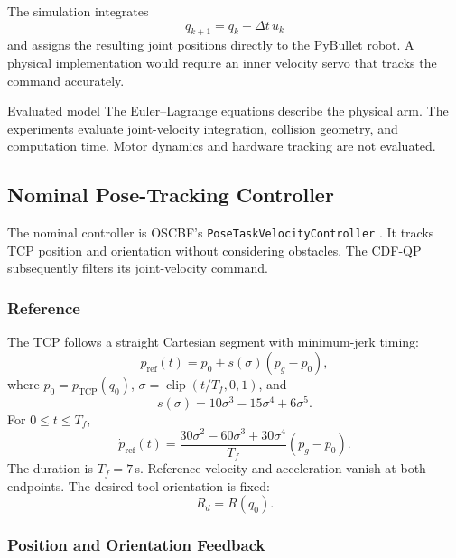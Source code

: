 \documentclass[conference]{IEEEtran}
\DeclareMathOperator{\clip}{clip}
\begin{document}
The simulation integrates
\begin{equation}
    q_{k+1}=q_k+\Delta t\,u_k
    \label{eq:integration}
\end{equation}
and assigns the resulting joint positions directly
to the PyBullet robot. A physical implementation
would require an inner velocity servo that tracks
the command accurately.

\begin{scopebox}{Evaluated model}
The Euler--Lagrange equations describe the physical
arm. The experiments evaluate joint-velocity
integration, collision geometry, and computation
time. Motor dynamics and hardware tracking are
not evaluated.
\end{scopebox}

\subsection{Nominal Pose-Tracking Controller}
\label{sec:nominal}

The nominal controller is OSCBF's
\texttt{PoseTaskVelocityController}
\cite{morton2025oscbf}.
It tracks TCP position and orientation without
considering obstacles. The CDF-QP subsequently
filters its joint-velocity command.

\subsubsection{Reference}

The TCP follows a straight Cartesian segment
with minimum-jerk timing:
\begin{equation}
    p_{\mathrm{ref}}(t)
    =p_0+s(\sigma)(p_g-p_0),
\end{equation}
where $p_0=p_{\mathrm{TCP}}(q_0)$,
$\sigma=\clip(t/T_f,0,1)$, and
\begin{equation}
    s(\sigma)=10\sigma^3-15\sigma^4+6\sigma^5.
\end{equation}
For $0\leq t\leq T_f$,
\begin{equation}
    \dot p_{\mathrm{ref}}(t)=
    \frac{30\sigma^2-60\sigma^3+30\sigma^4}{T_f}
    (p_g-p_0).
\end{equation}
The duration is $T_f=7$\,s. Reference velocity
and acceleration vanish at both endpoints.
The desired tool orientation is fixed:
\begin{equation}
    R_d=R(q_0).
\end{equation}

\subsubsection{Position and Orientation Feedback}
\end{document}
